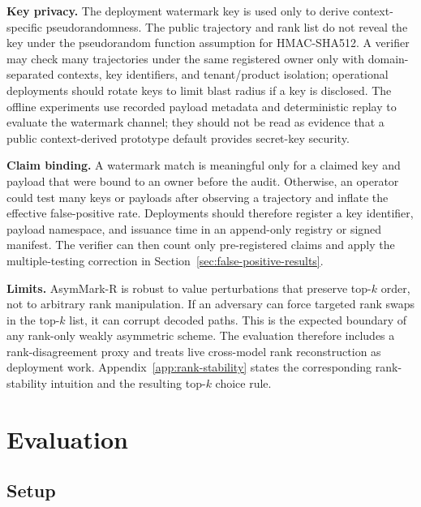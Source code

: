 \documentclass[conference,compsoc]{IEEEtran}
\newcommand{\ours}{AsymMark-R}
\begin{document}
\textbf{Key privacy.}
The deployment watermark key is used only to derive context-specific pseudorandomness. The public trajectory and rank list do not reveal the key under the pseudorandom function assumption for HMAC-SHA512. A verifier may check many trajectories under the same registered owner only with domain-separated contexts, key identifiers, and tenant/product isolation; operational deployments should rotate keys to limit blast radius if a key is disclosed. The offline experiments use recorded payload metadata and deterministic replay to evaluate the watermark channel; they should not be read as evidence that a public context-derived prototype default provides secret-key security.

\textbf{Claim binding.}
A watermark match is meaningful only for a claimed key and payload that were bound to an owner before the audit. Otherwise, an operator could test many keys or payloads after observing a trajectory and inflate the effective false-positive rate. Deployments should therefore register a key identifier, payload namespace, and issuance time in an append-only registry or signed manifest. The verifier can then count only pre-registered claims and apply the multiple-testing correction in Section~\ref{sec:false-positive-results}.

\textbf{Limits.}
\ours{} is robust to value perturbations that preserve top-$k$ order, not to arbitrary rank manipulation. If an adversary can force targeted rank swaps in the top-$k$ list, it can corrupt decoded paths. This is the expected boundary of any rank-only weakly asymmetric scheme. The evaluation therefore includes a rank-disagreement proxy and treats live cross-model rank reconstruction as deployment work. Appendix~\ref{app:rank-stability} states the corresponding rank-stability intuition and the resulting top-$k$ choice rule.

\section{Evaluation}
\label{sec:evaluation}

\subsection{Setup}
\end{document}
